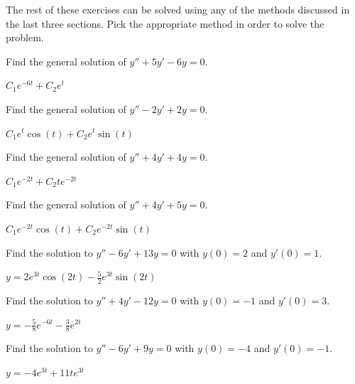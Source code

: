 \noindent The rest of these exercises can be solved using any of the methods discussed in the last three sections. Pick the appropriate method in order to solve the problem.

\begin{exercise}
Find the general solution of $y'' + 5y' - 6y = 0$.
\end{exercise}
\comboSol{%
}
{%
$C_1e^{-6t} + C_2e^t$
}

\begin{exercise}
Find the general solution of $y'' - 2y' + 2y = 0$.
\end{exercise}
\comboSol{%
}
{%
$C_1e^t\cos(t) + C_2e^t\sin(t)$
}

\begin{exercise}
Find the general solution of $y'' + 4y' + 4y = 0$.
\end{exercise}
\comboSol{%
}
{%
$C_1e^{-2t} + C_2te^{-2t}$
}

\begin{exercise}
Find the general solution of $y'' + 4y' + 5y = 0$.
\end{exercise}
\comboSol{%
}
{%
$C_1e^{-2t}\cos(t) + C_2e^{-2t}\sin(t)$
}

\begin{exercise}
Find the solution to $y'' - 6y' + 13y = 0$ with $y(0) = 2$ and $y'(0) = 1$. 
\end{exercise}
\comboSol{%
}
{%
$y = 2e^{3t}\cos(2t) - \frac{5}{2}e^{3t}\sin(2t)$
}

\begin{exercise}
Find the solution to $y'' + 4y' - 12y = 0$ with $y(0) = -1$ and $y'(0) = 3$. 
\end{exercise}
\comboSol{%
}
{%
$y= -\frac{5}{8}e^{-6t} - \frac{3}{8}e^{2t}$
}

\begin{exercise}
Find the solution to $y'' - 6y' + 9y = 0$ with $y(0) = -4$ and $y'(0) = -1$. 
\end{exercise}
\comboSol{%
}
{%
$y = -4e^{3t} + 11te^{3t}$
}



